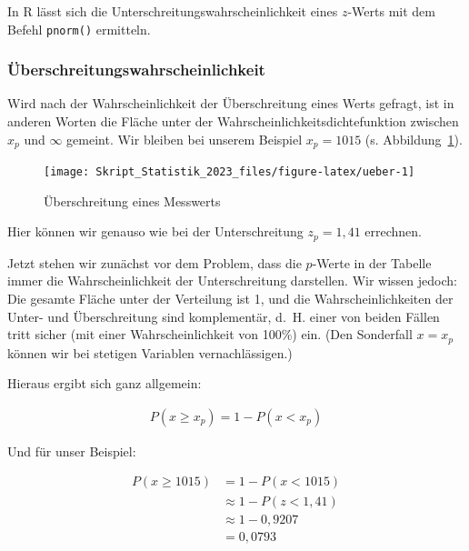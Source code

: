 \documentclass[
  11pt,
  ngerman,
  a4paper,
]{report}
\newenvironment{rtip}{
  \medskip
  \begin{tcolorbox}[colframe=purple,colback=light_gray,title=Softwarehinweis]
}{
  \end{tcolorbox}
  \medskip
}
\begin{document}
\begin{rtip}
In R lässt sich die Unterschreitungswahrscheinlichkeit eines $z$-Werts mit dem Befehl \verb|pnorm()| ermitteln.
\end{rtip}

\hypertarget{uxfcberschreitungswahrscheinlichkeit}{%
\subsubsection{Überschreitungswahrscheinlichkeit}\label{uxfcberschreitungswahrscheinlichkeit}}

Wird nach der Wahrscheinlichkeit der Überschreitung eines Werts gefragt, ist in anderen Worten die Fläche unter der Wahrscheinlichkeitsdichtefunktion zwischen \(x_p\) und \(\infty\) gemeint. Wir bleiben bei unserem Beispiel \(x_p=1015\) (s. Abbildung~\ref{fig:ueber}).

\begin{figure}[!h]

{\centering \texttt{[image: Skript\_Statistik\_2023\_files/figure-latex/ueber-1]} 

}

\caption{Überschreitung eines Messwerts}\label{fig:ueber}
\end{figure}

Hier können wir genauso wie bei der Unterschreitung \(z_p=1{,}41\) errechnen.

Jetzt stehen wir zunächst vor dem Problem, dass die \(p\)-Werte in der Tabelle immer die Wahrscheinlichkeit der Unterschreitung darstellen. Wir wissen jedoch: Die gesamte Fläche unter der Verteilung ist 1, und die Wahrscheinlichkeiten der Unter- und Überschreitung sind komplementär, d.~H. einer von beiden Fällen tritt sicher (mit einer Wahrscheinlichkeit von 100\%) ein. (Den Sonderfall \(x=x_p\) können wir bei stetigen Variablen vernachlässigen.)

Hieraus ergibt sich ganz allgemein:

\[
  \begin{aligned}
    P(x \geq x_p) = 1-P(x<x_p)
  \end{aligned}
  \label{eq:ueber}
\]

Und für unser Beispiel:

\[
  \begin{aligned}
    P(x \geq 1015) &= 1-P(x < 1015) \\
    &\approx1-P(z < 1,41)\\
    &\approx1-0{,}9207\\
    &= 0{,}0793
  \end{aligned}
\]
\end{document}
